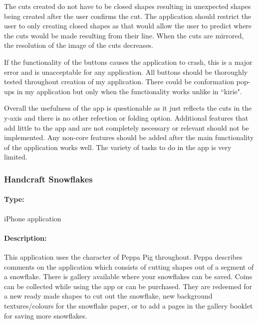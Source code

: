 \documentclass[11pt]{article}
\begin{document}
                The cuts created do not have to be closed shapes resulting in unexpected shapes being created after the user confirms the cut. The application should restrict the user to only creating closed shapes as that would allow the user to predict where the cuts would be made resulting from their line. When the cuts are mirrored, the resolution of the image of the cuts decreases.
               
                If the functionality of the buttons causes the application to crash, this is a major error and is unacceptable for any application. All buttons should be thoroughly tested throughout creation of my application. There could be conformation pop-ups in my application but only when the functionality works unlike in ``kirie".
                
                Overall the usefulness of the app is questionable as it just reflects the cuts in the y-axis and there is no other refection or folding option. Additional features that add little to the app and are not completely necessary or relevant should not be implemented. Any non-core features should be added after the main functionality of the application works well. The variety of tasks to do in the app is very limited.
                
                
                 \subsubsection{Handcraft Snowflakes}
            
                \paragraph{Type:} iPhone application %

                \paragraph{Description:}
                This application uses the character of Peppa Pig throughout. Peppa describes comments on the application which consists of cutting shapes out of a segment of a snowflake. There is gallery available where your snowflakes can be saved. Coins can be collected while using the app or can be purchased. They are redeemed for a new ready made shapes to cut out the snowflake, new background textures/colours for the snowflake paper, or to add a pages in the gallery booklet for saving more snowflakes. 
\end{document}
